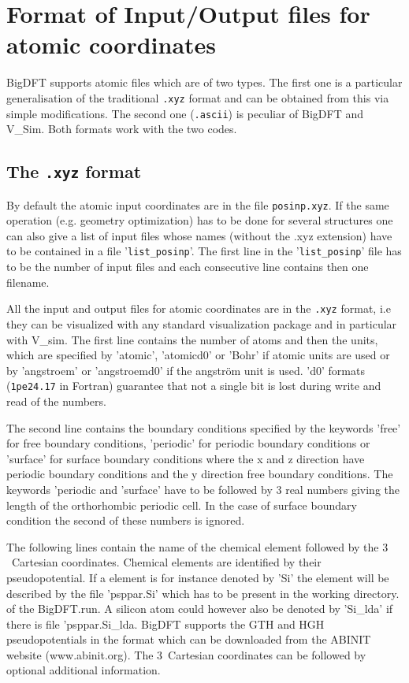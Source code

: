 \documentclass[a4paper,11pt]{report}
\begin{document}
\section{Format of Input/Output files for atomic coordinates} 
BigDFT supports atomic files which are of two types.
The first one is a particular generalisation of the traditional \texttt{.xyz} format and can be obtained from this via simple modifications.
The second one (\texttt{.ascii}) is peculiar of BigDFT and V\_Sim. Both formats work with the two codes.
\subsection{The \texttt{.xyz} format}
By default the atomic input coordinates are in the file \texttt{posinp.xyz}.
If the same operation (e.g. geometry optimization) 
has to be done for several structures one can also give a list of input files whose names (without the .xyz extension) 
have to be contained in a file '\texttt{list\_posinp}'. The first line in the '\texttt{list\_posinp}' file has to be the number of input 
files and each consecutive line contains then one filename.

All the input and output files for atomic coordinates are in the \texttt{.xyz} format, i.e they can be visualized with any 
standard visualization package and in particular with V\_sim. The first line contains the number of atoms 
and then the units, which are specified by 'atomic', 'atomicd0' or 'Bohr' if atomic units are used or by 
'angstroem' or 'angstroemd0' if the angstr\"om unit is used. 'd0' formats (\texttt{1pe24.17} in Fortran) guarantee that not a single bit is 
lost during write and read of the numbers.

The second line contains the boundary conditions specified by the keywords 'free' for free boundary 
conditions, 'periodic' for periodic boundary conditions or 'surface' for surface boundary conditions
where the x and z direction have periodic boundary conditions and the y direction free boundary conditions. 
The keywords 'periodic and 'surface' have to be followed by 3 real numbers giving the length of the 
orthorhombic periodic cell. In the case of surface boundary condition the second of these numbers is ignored.

The following lines contain the name of the chemical element followed by the $3$~Cartesian coordinates. 
Chemical elements are identified by their pseudopotential. If a element is for instance denoted by 
'Si' the element will be described by the file 'psppar.Si' which has to be present in the working directory.
of the BigDFT.run. A silicon atom could however also be denoted by 'Si\_lda' if there is file 'psppar.Si\_lda.
BigDFT supports the GTH and HGH pseudopotentials in the format which can be downloaded from the ABINIT website
(www.abinit.org). The $3$~Cartesian coordinates can be followed by optional additional information.
\end{document}
